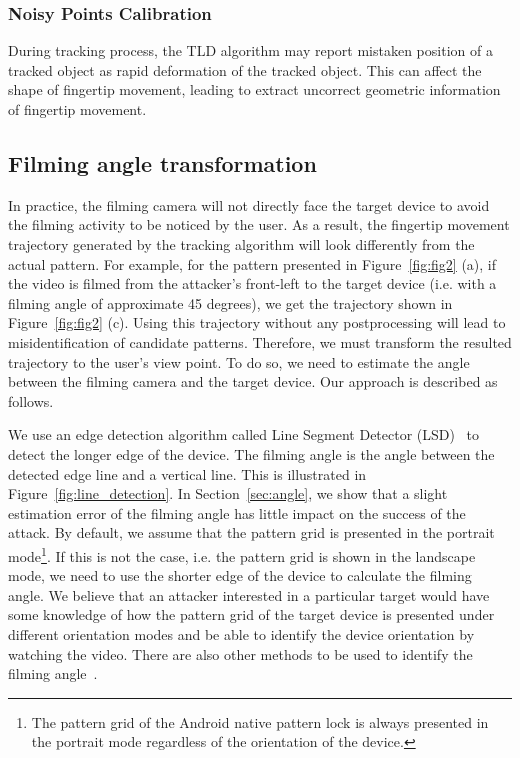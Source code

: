         \subsubsection{Noisy Points Calibration}
            During tracking process, the TLD algorithm may report mistaken position of a tracked object as rapid deformation of the tracked object. This can affect the shape of fingertip movement, leading to extract uncorrect geometric information of fingertip movement.

\subsection{Filming angle transformation}
\label{sec:transformation}
In practice, the filming camera will not directly face the target device to avoid the filming activity to be noticed by the user. As a result, the
fingertip movement trajectory generated by the tracking
algorithm will look differently from the actual pattern. For example, for the
pattern presented in Figure~\ref{fig:fig2} (a), if the video is filmed from the attacker's front-left to the target device (i.e. with a filming angle of approximate 45 degrees),
we get the trajectory shown in Figure~\ref{fig:fig2} (c).
Using this trajectory without any postprocessing will lead to misidentification of candidate patterns.
Therefore, we must transform the resulted trajectory to the user's view point. To do so, we need to estimate the angle between the filming camera and the target device. Our approach is described as follows.

We use an edge detection algorithm called Line Segment Detector (LSD)~\cite{grompone2010lsd} to detect the longer edge of the device.
The filming angle is the angle between the detected edge line and a vertical line. This is illustrated in Figure~\ref{fig:line_detection}.
In Section~\ref{sec:angle}, we show that a slight estimation error of the filming angle has little impact on the success of the attack.
By default, we assume that the pattern grid is presented in the portrait
mode\footnote{The pattern grid of the Android native pattern lock is always presented in the portrait mode regardless of the orientation of the device.}. If this is
not the case, i.e. the pattern grid is shown in the landscape mode, we need
to use the shorter edge of the device to calculate the filming angle. We believe that an attacker interested in a particular target would
have some knowledge of how the pattern grid of the target device is presented under different orientation modes and be able to identify the device orientation by watching the video.
There are also other methods to be used to identify the filming angle~\cite{Torralba:2002:DEI:628330.628820}.


